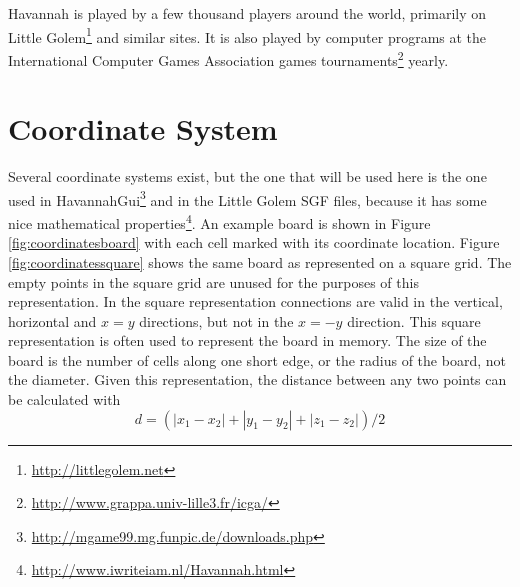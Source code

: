 Havannah is played by a few thousand players around the world, primarily on Little Golem\footnote{\url{http://littlegolem.net}} and similar sites. It is also played by computer programs at the International Computer Games Association games tournaments\footnote{\url{http://www.grappa.univ-lille3.fr/icga/}} yearly.



\section{Coordinate System}

Several coordinate systems exist, but the one that will be used here is the one used in HavannahGui\footnote{\url{http://mgame99.mg.funpic.de/downloads.php}} and in the Little Golem SGF files, because it has some nice mathematical properties\footnote{\url{http://www.iwriteiam.nl/Havannah.html}}. An example board is shown in Figure \ref{fig:coordinatesboard} with each cell marked with its coordinate location. Figure \ref{fig:coordinatessquare} shows the same board as represented on a square grid. The empty points in the square grid are unused for the purposes of this representation. In the square representation connections are valid in the vertical, horizontal and $x=y$ directions, but not in the $x=-y$ direction. This square representation is often used to represent the board in memory. The size of the board is the number of cells along one short edge, or the radius of the board, not the diameter. Given this representation, the distance between any two points can be calculated with $$d = (|x_1-x_2| + |y_1-y_2| + |z_1-z_2|)/2$$


